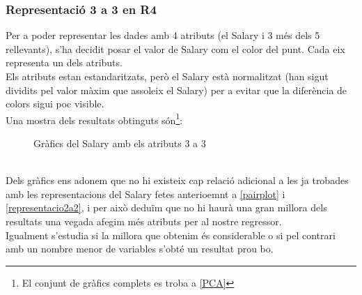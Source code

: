 \documentclass[a4paper, 11pt]{article}
\begin{document}
\subsubsection{Representació 3 a 3 en R4}
Per a poder representar les dades amb 4 atributs (el Salary i 3 més dels 5 rellevants), s'ha decidit posar el valor de Salary com el color del punt. Cada eix representa un dels atributs.\\
Els atributs estan  estandaritzats, però el Salary està normalitzat (han sigut dividits pel valor màxim que assoleix el Salary) per a evitar que la diferència de colors sigui poc visible.\\
Una mostra dels resultats obtinguts són\footnote{El conjunt de gràfics complets es troba a \textcolor{blue}{\ref{PCA}}}:
\begin{figure}[h]
 \centering
  \caption{Gràfics del Salary amb els atributs 3 a 3 }
 \end{figure}\\
 Dels gràfics ens adonem que no hi existeix cap relació adicional a les ja trobades amb les representacions del Salary fetes anterioemnt a \textcolor{blue}{\ref{pairplot}} i \textcolor{blue}{\ref{representacio2a2}}, i per això deduïm que no hi haurà una gran millora dels resultats una vegada afegim més atributs per al nostre regressor.\\ 
 Igualment s'estudia si la millora que obtenim és considerable o si pel contrari amb un nombre menor de variables s'obté un resultat prou bo.
 \newpage
\end{document}
